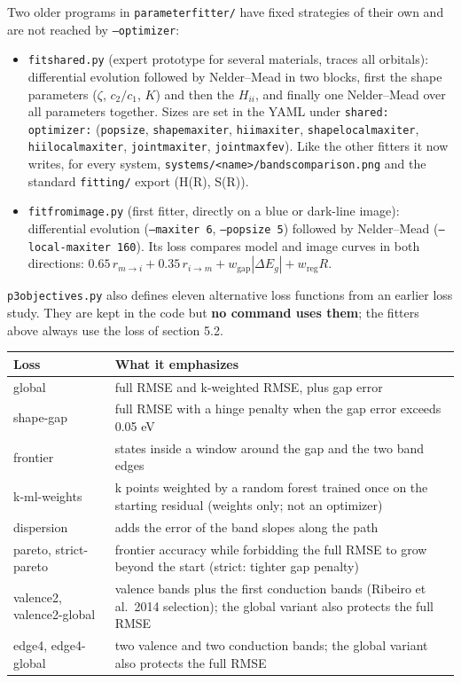 \documentclass[11pt,a4paper]{article}
\newcommand{\cmd}[1]{\texttt{#1}}
\renewcommand{\_}{\origunderscore\allowbreak}
\begin{document}
Two older programs in \cmd{parameter\_fitter/} have fixed strategies of their own and are not reached by
\cmd{--optimizer}:

\begin{itemize}
  \item \cmd{fit\_shared.py} (expert prototype for several materials, traces all orbitals): differential
        evolution followed by Nelder--Mead in two blocks, first the shape parameters ($\zeta$, $c_2/c_1$,
        $K$) and then the $H_{ii}$, and finally one Nelder--Mead over all parameters together. Sizes are
        set in the YAML under \cmd{shared: optimizer:} (\cmd{popsize}, \cmd{shape\_maxiter},
        \cmd{hii\_maxiter}, \cmd{shape\_local\_maxiter}, \cmd{hii\_local\_maxiter}, \cmd{joint\_maxiter},
        \cmd{joint\_maxfev}). Like the other fitters it now writes, for every system,
        \cmd{systems/<name>/bands\_comparison.png} and the standard \cmd{fitting/} export (H(R), S(R)).
  \item \cmd{fit\_from\_image.py} (first fitter, directly on a blue or dark-line image): differential
        evolution (\cmd{--maxiter 6}, \cmd{--popsize 5}) followed by Nelder--Mead
        (\cmd{--local-maxiter 160}). Its loss compares model and image curves in both directions:
        $0.65\,r_{m\to i} + 0.35\,r_{i\to m} + w_\text{gap}|\Delta E_g| + w_\text{reg}R$.
\end{itemize}

\cmd{p3\_objectives.py} also defines eleven alternative loss functions from an earlier loss study.
They are kept in the code but \textbf{no command uses them}; the fitters above always use the loss of
section 5.2.

\begin{center}
\small
\begin{tabularx}{\textwidth}{>{\ttfamily}l L}
\toprule
\normalfont Loss & What it emphasizes \\
\midrule
global & full RMSE and k-weighted RMSE, plus gap error \\
shape-gap & full RMSE with a hinge penalty when the gap error exceeds 0.05 eV \\
frontier & states inside a window around the gap and the two band edges \\
k-ml-weights & k points weighted by a random forest trained once on the starting residual (weights only; not an optimizer) \\
dispersion & adds the error of the band slopes along the path \\
pareto, strict-pareto & frontier accuracy while forbidding the full RMSE to grow beyond the start (strict: tighter gap penalty) \\
valence2, valence2-global & valence bands plus the first conduction bands (Ribeiro et al.\ 2014 selection); the global variant also protects the full RMSE \\
edge4, edge4-global & two valence and two conduction bands; the global variant also protects the full RMSE \\
\bottomrule
\end{tabularx}
\end{center}
\end{document}
